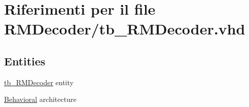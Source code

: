 \hypertarget{tb___r_m_decoder_8vhd}{\section{Riferimenti per il file R\+M\+Decoder/tb\+\_\+\+R\+M\+Decoder.vhd}
\label{tb___r_m_decoder_8vhd}
}
\subsection*{Entities}
\begin{DoxyCompactItemize}
\item 
\hyperlink{classtb___r_m_decoder}{tb\+\_\+\+R\+M\+Decoder} entity
\item 
\hyperlink{classtb___r_m_decoder_1_1_behavioral}{Behavioral} architecture
\end{DoxyCompactItemize}
